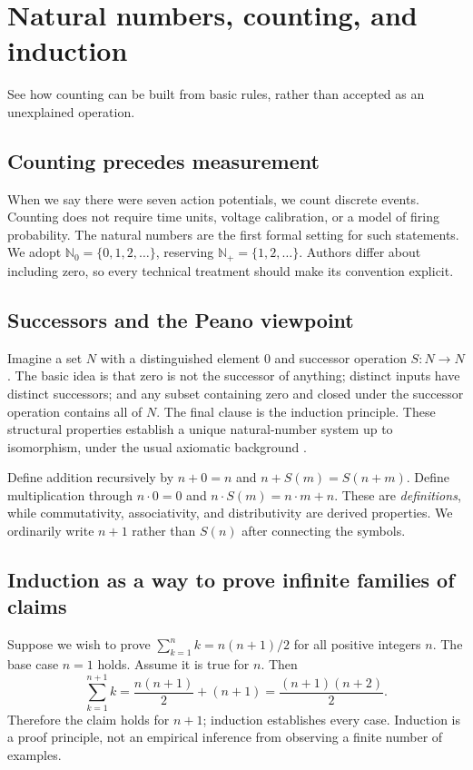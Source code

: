 \chapter{Natural numbers, counting, and induction}\label{ch:naturals}
\begin{readergoal}See how counting can be built from basic rules, rather than accepted as an unexplained operation.\end{readergoal}
\section{Counting precedes measurement}
When we say there were seven action potentials, we count discrete events. Counting does not require time units, voltage calibration, or a model of firing probability. The natural numbers are the first formal setting for such statements. We adopt $\mathbb N_0=\{0,1,2,\ldots\}$, reserving $\mathbb N_+=\{1,2,\ldots\}$. Authors differ about including zero, so every technical treatment should make its convention explicit.

\section{Successors and the Peano viewpoint}
Imagine a set $N$ with a distinguished element $0$ and successor operation $S:N\to N$. The basic idea is that zero is not the successor of anything; distinct inputs have distinct successors; and any subset containing zero and closed under the successor operation contains all of $N$. The final clause is the induction principle. These structural properties establish a unique natural-number system up to isomorphism, under the usual axiomatic background \cite{MendelsonNumbers}.

Define addition recursively by $n+0=n$ and $n+S(m)=S(n+m)$. Define multiplication through $n\cdot0=0$ and $n\cdot S(m)=n\cdot m+n$. These are \emph{definitions}, while commutativity, associativity, and distributivity are derived properties. We ordinarily write $n+1$ rather than $S(n)$ after connecting the symbols.

\section{Induction as a way to prove infinite families of claims}
Suppose we wish to prove $\sum_{k=1}^n k=n(n+1)/2$ for all positive integers $n$. The base case $n=1$ holds. Assume it is true for $n$. Then
\[\sum_{k=1}^{n+1}k=\frac{n(n+1)}2+(n+1)=\frac{(n+1)(n+2)}2.\]
Therefore the claim holds for $n+1$; induction establishes every case. Induction is a proof principle, not an empirical inference from observing a finite number of examples.


